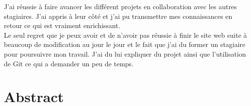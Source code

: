 \documentclass[12pt,a4paper]{report}
\begin{document}
J'ai réussie à faire avancer les différent projets en collaboration avec les autres stagiaires. J'ai appris à leur côté et j'ai pu transmettre mes connaissances en retour ce qui est vraiment enrichissant.\\ 

Le seul regret que je peux avoir et de n'avoir pas réussie à finir le site web suite à beaucoup de modification au jour le jour et le fait que j'ai du former un stagiaire pour poursuivre mon travail. J'ai du lui expliquer  du projet ainsi que l'utilisation de Git ce qui a demander un peu de temps. 


\chapter[Abstact]{Abstract}
\end{document}
